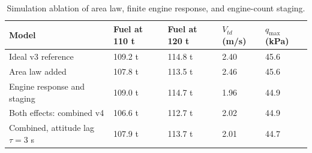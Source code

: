 \begin{table}[htbp]
\caption{Simulation ablation of area law, finite engine response, and engine-count staging.}
\label{tab:src18}
\small
\setlength{\tabcolsep}{3.5pt}
\begin{tabularx}{\linewidth}{@{}p{.36\linewidth}XXXX@{}}
\toprule
Model & Fuel at 110 t & Fuel at 120 t & $V_{td}$ (m/s) & $q_{\max}$ (kPa) \\
\midrule
Ideal v3 reference & 109.2 t & 114.8 t & 2.40 & 45.6 \\
Area law added & 107.8 t & 113.5 t & 2.46 & 45.6 \\
Engine response and staging & 109.0 t & 114.7 t & 1.96 & 44.9 \\
Both effects: combined v4 & 106.6 t & 112.7 t & 2.02 & 44.9 \\
Combined, attitude lag $\tau=3$ s & 107.9 t & 113.7 t & 2.01 & 44.7 \\
\bottomrule
\end{tabularx}
\end{table}

